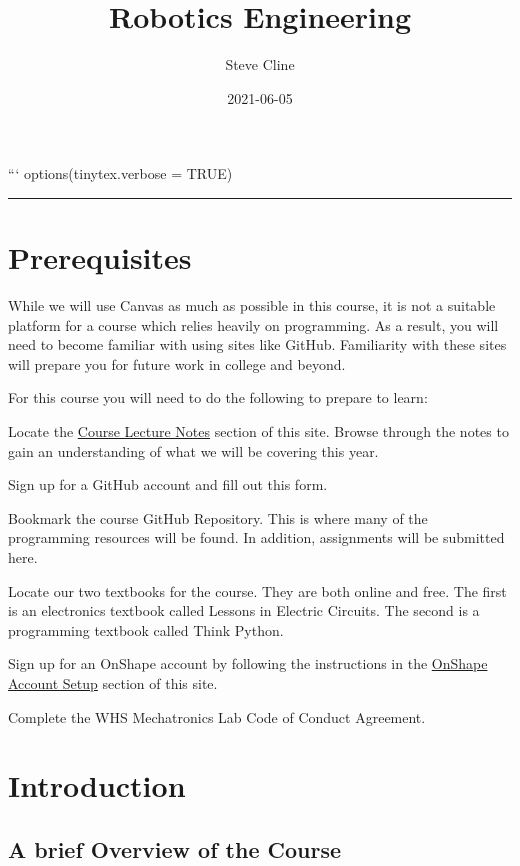 \documentclass[
]{book}
\title{Robotics Engineering}
\author{Steve Cline}
\date{2021-06-05}
\begin{document}
\maketitle

{
\setcounter{tocdepth}{1}
\tableofcontents
}
```
options(tinytex.verbose = TRUE)

\begin{center}\rule{0.5\linewidth}{0.5pt}\end{center}

\hypertarget{prerequisites}{%
\chapter{Prerequisites}\label{prerequisites}}

While we will use Canvas as much as possible in this course, it is not a suitable platform for a course which relies heavily on programming. As a result, you will need to become familiar with using sites like GitHub. Familiarity with these sites will prepare you for future work in college and beyond.

For this course you will need to do the following to prepare to learn:

Locate the \protect\hyperlink{course-lecture-notes}{Course Lecture Notes} section of this site. Browse through the notes to gain an understanding of what we will be covering this year.

Sign up for a GitHub account and fill out this form.

Bookmark the course GitHub Repository. This is where many of the programming resources will be found. In addition, assignments will be submitted here.

Locate our two textbooks for the course. They are both online and free. The first is an electronics textbook called Lessons in Electric Circuits. The second is a programming textbook called Think Python.

Sign up for an OnShape account by following the instructions in the \protect\hyperlink{onshape-account-setup}{OnShape Account Setup} section of this site.

Complete the WHS Mechatronics Lab Code of Conduct Agreement.

\hypertarget{intro}{%
\chapter{Introduction}\label{intro}}

\hypertarget{a-brief-overview-of-the-course}{%
\section{A brief Overview of the Course}\label{a-brief-overview-of-the-course}}
\end{document}
